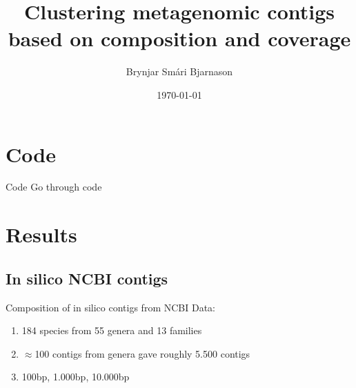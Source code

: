 \documentclass{beamer}
\title[Clustering metagenomic contigs]{Clustering metagenomic contigs based on composition and coverage}
\author{Brynjar Smári Bjarnason}
\institute{KTH -- School of Computer Science and Communication}
\date{\today}
\begin{document}
\section{Code}
\begin{frame}
\titlepage
\end{frame}
\begin{frame}{Code}
Go through code
\end{frame}

\section{Results}
\subsection{In silico NCBI contigs}
\begin{frame}{Composition of in silico contigs from NCBI}
Data:
\begin{enumerate}
\item 184 species from 55 genera and 13 families
\item $\approx$100 contigs from genera gave roughly 5.500 contigs
\item 100bp, 1.000bp, 10.000bp
\end{enumerate}
\end{frame}
\end{document}
